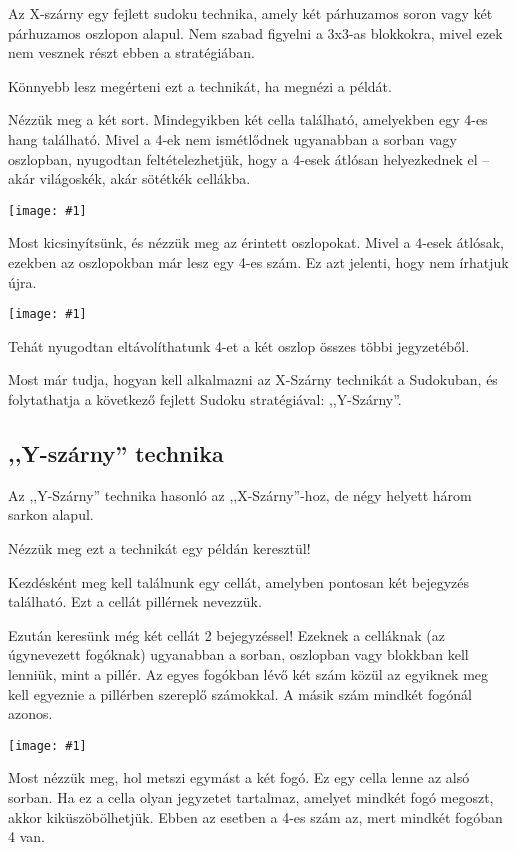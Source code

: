 \documentclass[a4paper,12pt,twoside]{article}
\newcommand{\kep}[1]{\texttt{[image: \#1]}}
\begin{document}
Az X-szárny egy fejlett sudoku technika, amely két párhuzamos soron vagy két párhuzamos oszlopon alapul. Nem szabad figyelni a 3x3-as blokkokra, mivel ezek nem vesznek részt ebben a stratégiában.

Könnyebb lesz megérteni ezt a technikát, ha megnézi a példát.

Nézzük meg a két sort. Mindegyikben két cella található, amelyekben egy 4-es hang található. Mivel a 4-ek nem ismétlődnek ugyanabban a sorban vagy oszlopban, nyugodtan feltételezhetjük, hogy a 4-esek átlósan helyezkednek el – akár világoskék, akár sötétkék cellákba.

\kep{1691408445-X-wing_1.png}

Most kicsinyítsünk, és nézzük meg az érintett oszlopokat. Mivel a 4-esek átlósak, ezekben az oszlopokban már lesz egy 4-es szám. Ez azt jelenti, hogy nem írhatjuk újra.

\kep{1691408472-X-wing_2.png}


Tehát nyugodtan eltávolíthatunk 4-et a két oszlop összes többi jegyzetéből.

Most már tudja, hogyan kell alkalmazni az X-Szárny technikát a Sudokuban, és folytathatja a következő fejlett Sudoku stratégiával: ,,Y-Szárny''.


\clearpage
\subsection{,,Y-szárny'' technika}

Az ,,Y-Szárny'' technika hasonló az ,,X-Szárny''-hoz, de négy helyett három sarkon alapul.

Nézzük meg ezt a technikát egy példán keresztül!

Kezdésként meg kell találnunk egy cellát, amelyben pontosan két bejegyzés található. Ezt a cellát pillérnek nevezzük.

Ezután keresünk még két cellát 2 bejegyzéssel! Ezeknek a celláknak (az úgynevezett fogóknak) ugyanabban a sorban, oszlopban vagy blokkban kell lenniük, mint a pillér. Az egyes fogókban lévő két szám közül az egyiknek meg kell egyeznie a pillérben szereplő számokkal. A másik szám mindkét fogónál azonos.

\kep{1646984426-14. Y-wing_1.png}


Most nézzük meg, hol metszi egymást a két fogó. Ez egy cella lenne az alsó sorban. Ha ez a cella olyan jegyzetet tartalmaz, amelyet mindkét fogó megoszt, akkor kiküszöbölhetjük. Ebben az esetben a 4-es szám az, mert mindkét fogóban 4 van.
\end{document}
